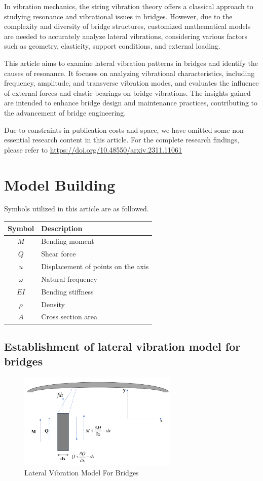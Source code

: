 \documentclass[conference]{IEEEtran}
\begin{document}
In vibration mechanics, the string vibration theory offers a classical approach to studying resonance and vibrational issues in bridges. However, due to the complexity and diversity of bridge structures, customized mathematical models are needed to accurately analyze lateral vibrations, considering various factors such as geometry, elasticity, support conditions, and external loading\cite{fujino2019research}.

This article aims to examine lateral vibration patterns in bridges and identify the causes of resonance. It focuses on analyzing vibrational characteristics, including frequency, amplitude, and transverse vibration modes, and evaluates the influence of external forces and elastic bearings on bridge vibrations. The insights gained are intended to enhance bridge design and maintenance practices, contributing to the advancement of bridge engineering.

Due to constraints in publication costs and space, we have omitted some non-essential research content in this article. For the complete research findings, please refer to \url{https://doi.org/10.48550/arxiv.2311.11061}




\section{Model Building}
Symbols utilized in this article are as followed.
\begin{table}[h]
\centering
\begin{tabular}{cl}
\hline
Symbol & Description \\
\hline
\( M \) & Bending moment \\
\( Q \) & Shear force \\
\( u \) & Displacement of points on the axis \\
\( \omega \) & Natural frequency \\
\( EI \) & Bending stiffness \\
\( \rho \) & Density \\
\( A \) & Cross section area \\
\hline
\end{tabular}
\end{table}

\subsection{Establishment of lateral vibration model for bridges}
\begin{figure}[ht!] %
\centering
\includegraphics[width=3.0in]{1.png}
\caption{Lateral Vibration Model For Bridges}
\label{1}
\end{figure}
\end{document}
